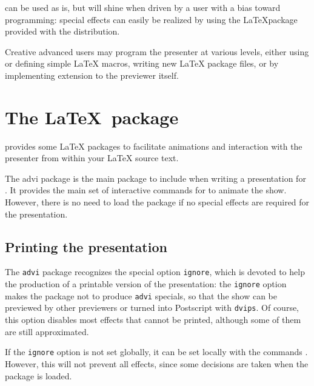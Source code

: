\documentclass[12pt]{article}
\begin{document}
{\ActiveDVI} can be used as is, but will shine when driven by a user
with a bias toward programming: special effects can easily 
be realized by using the \LaTeX package provided with the distribution. 

Creative advanced users may program the presenter at various levels, either
using or defining simple {\LaTeX} macros, writing new {\LaTeX} package
files, or by implementing extension to the previewer itself.



\section {The  \LaTeX~package}


{\ActiveDVI} provides some {\LaTeX} packages to facilitate animations and
interaction with the presenter from within your {\LaTeX} source text.

The  advi package is the main package to include when writing
a presentation for {\ActiveDVI}. It provides the main set of interactive
commands for {\ActiveDVI} to animate the show. However, there is no
need to load the package if no {\ActiveDVI} special effects are
required for the presentation.

\subsection{Printing the presentation}

The {\tt advi} package recognizes the special option \verb"ignore",
which is devoted to help the production of a printable version of the
presentation: the \verb"ignore" option makes the package not to
produce {\tt advi} specials, so that the show can be previewed by
other previewers or turned into Postscript with {\tt dvips}. Of
course, this option disables most effects that cannot be printed,
although some of them are still approximated.

If the {\tt ignore} option is not set globally, it can be set
locally with the commands {\docdef \adviignore}. However, this will not
prevent all effects, since some decisions are taken when the package is
loaded.
\end{document}
